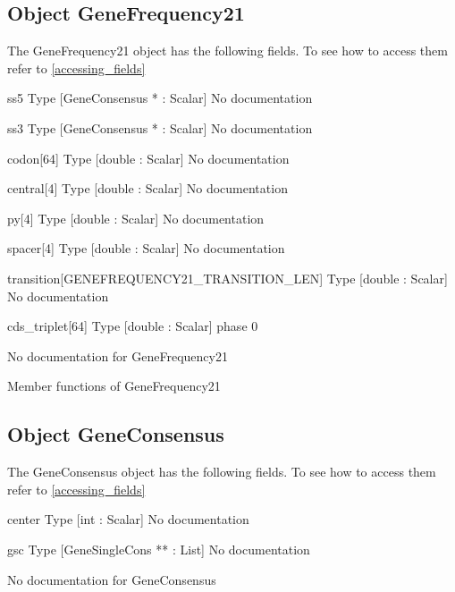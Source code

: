 \subsection{Object GeneFrequency21}

\label{object_GeneFrequency21}

The GeneFrequency21 object has the following fields. To see how to access them refer to \ref{accessing_fields}
\begin{description}
\item{ss5} Type [GeneConsensus * : Scalar] No documentation

\item{ss3} Type [GeneConsensus * : Scalar] No documentation

\item{codon[64]} Type [double : Scalar] No documentation

\item{central[4]} Type [double : Scalar] No documentation

\item{py[4]} Type [double : Scalar] No documentation

\item{spacer[4]} Type [double : Scalar] No documentation

\item{transition[GENEFREQUENCY21_TRANSITION_LEN]} Type [double : Scalar] No documentation

\item{cds_triplet[64]} Type [double : Scalar]  phase 0

\end{description}
No documentation for GeneFrequency21

Member functions of GeneFrequency21

\subsection{Object GeneConsensus}

\label{object_GeneConsensus}

The GeneConsensus object has the following fields. To see how to access them refer to \ref{accessing_fields}
\begin{description}
\item{center} Type [int : Scalar] No documentation

\item{gsc} Type [GeneSingleCons ** : List] No documentation

\end{description}
No documentation for GeneConsensus

